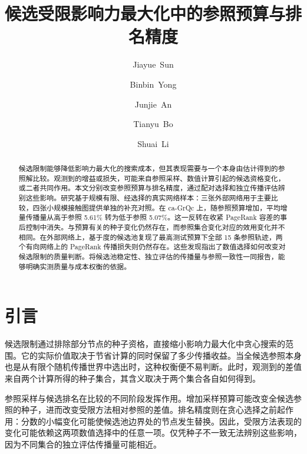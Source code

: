 \documentclass[smallextended]{svjour3}
\begin{document}
\def\abstractname{摘要}\def\keywordname{\textbf{关键词}}\def\figurename{图}\def\tablename{表}\def\refname{参考文献}
\title{候选受限影响力最大化中的参照预算与排名精度}
\author{\mbox{Jiayue Sun} \and \mbox{Binbin Yong} \and \mbox{Junjie An} \and \mbox{Tianyu Bo} \and \mbox{Shuai Li}}
\date{}
\maketitle
\begin{abstract}
候选限制能够降低影响力最大化的搜索成本，但其表现需要与一个本身由估计得到的参照解比较。观测到的增益或损失，可能来自参照采样、数值计算引起的候选资格变化，或二者共同作用。本文分别改变参照预算与排名精度，通过配对选择和独立传播评估辨别这些影响。研究基于规模有限、经选择的真实网络样本：三张外部网络用于主要比较，四张小规模接触图提供单独的补充对照。在 ca-GrQc 上，随参照预算增加，平均增量传播量从高于参照 5.61\% 转为低于参照 5.07\%。这一反转在收紧 PageRank 容差的事后控制中消失。与预算有关的种子变化仍然存在，而参照集合变化对应的效用变化并不相同。在外部网络上，基于度的候选池复现了最高测试预算下全部 15 条参照轨迹，两个有向网络上的 PageRank 传播损失则仍然存在。这些发现指出了数值选择如何改变对候选限制的质量判断。将候选池稳定性、独立评估的传播量与参照一致性一同报告，能够明确实测质量与成本权衡的依据。
\end{abstract}

\section{引言}
候选限制通过排除部分节点的种子资格，直接缩小影响力最大化中贪心搜索的范围。它的实际价值取决于节省计算的同时保留了多少传播收益。当全候选参照本身也是从有限个随机传播世界中选出时，这种权衡便不易判断。此时，观测到的差值来自两个计算所得的种子集合，其含义取决于两个集合各自如何得到。

参照采样与候选排名在比较的不同阶段发挥作用。增加采样预算可能改变全候选参照的种子，进而改变受限方法相对参照的差值。排名精度则在贪心选择之前起作用：分数的小幅变化可能使候选池边界处的节点发生替换。因此，受限方法表现的变化可能依赖这两项数值选择中的任意一项。仅凭种子不一致无法辨别这些影响，因为不同集合的独立评估传播量可能相近。
\end{document}
